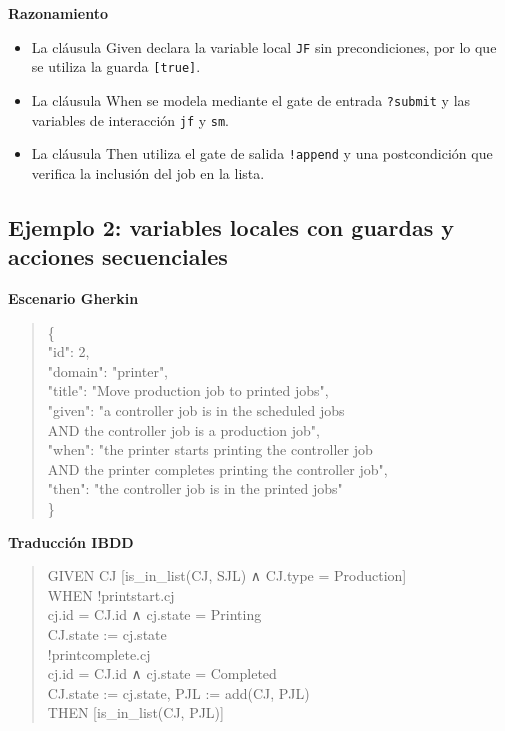 \textbf{Razonamiento}

\begin{itemize}
\item La cláusula Given declara la variable local \texttt{JF} sin precondiciones, por lo que se utiliza la guarda \texttt{[true]}.
\item La cláusula When se modela mediante el gate de entrada \texttt{?submit} y las variables de interacción \texttt{jf} y \texttt{sm}.
\item La cláusula Then utiliza el gate de salida \texttt{!append} y una postcondición que verifica la inclusión del job en la lista.
\end{itemize}

\subsection{Ejemplo 2: variables locales con guardas y acciones secuenciales}

\textbf{Escenario Gherkin}

\begin{quote}
\ttfamily\small
\{\\
\quad "id": 2,\\
\quad "domain": "printer",\\
\quad "title": "Move production job to printed jobs",\\
\quad "given": "a controller job is in the scheduled jobs\\
\quad AND the controller job is a production job",\\
\quad "when": "the printer starts printing the controller job\\
\quad AND the printer completes printing the controller job",\\
\quad "then": "the controller job is in the printed jobs"\\
\}
\end{quote}

\textbf{Traducción IBDD}

\begin{quote}
\ttfamily\small
GIVEN CJ [is\_in\_list(CJ, SJL) ∧ CJ.type = Production]\\
WHEN !printstart.cj\\
\quad cj.id = CJ.id ∧ cj.state = Printing\\
\quad CJ.state := cj.state\\
!printcomplete.cj\\
\quad cj.id = CJ.id ∧ cj.state = Completed\\
\quad CJ.state := cj.state, PJL := add(CJ, PJL)\\
THEN [is\_in\_list(CJ, PJL)]
\end{quote}

